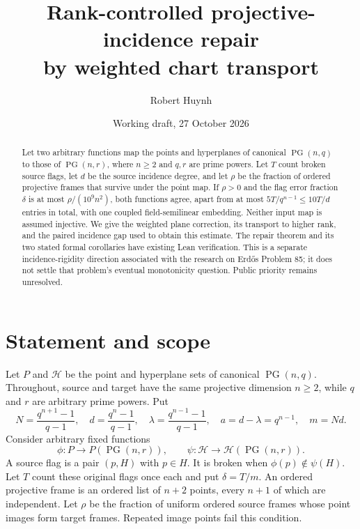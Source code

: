 \documentclass[11pt]{article}
\title{Rank-controlled projective-incidence repair\\by weighted chart transport}
\author{Robert Huynh}
\date{Working draft, 27 October 2026}
\newcommand{\PG}{\operatorname{PG}}
\begin{document}
\maketitle
\begin{abstract}
Let two arbitrary functions map the points and hyperplanes of canonical
$\PG(n,q)$ to those of $\PG(n,r)$, where $n\geq2$ and $q,r$ are prime
powers. Let $T$ count broken source flags, let $d$ be the source incidence
degree, and let $\rho$ be the fraction of ordered projective frames that
survive under the point map. If $\rho>0$ and the flag error fraction
$\delta$ is at most $\rho/(10^9n^2)$, both functions agree, apart from at
most $5T/q^{n-1}\leq10T/d$ entries in total, with one coupled field-semilinear
embedding. Neither input map is assumed injective. We give the weighted
plane correction, its transport to higher rank, and the paired incidence
gap used to obtain this estimate. The repair theorem and its two stated
formal corollaries have existing Lean verification. This is a separate
incidence-rigidity direction associated with the research on Erd\H{o}s
Problem 85; it does not settle that problem's eventual monotonicity question.
Public priority remains unresolved.
\end{abstract}
\tableofcontents

\section{Statement and scope}
Let $P$ and $\mathcal H$ be the point and hyperplane sets of canonical
$\PG(n,q)$. Throughout, source and target have the same projective dimension
$n\geq2$, while $q$ and $r$ are arbitrary prime powers. Put
\begin{equation}\label{counts}
 N=\frac{q^{n+1}-1}{q-1},\quad d=\frac{q^n-1}{q-1},\quad
 \lambda=\frac{q^{n-1}-1}{q-1},\quad a=d-\lambda=q^{n-1},\quad m=Nd.
\end{equation}
Consider arbitrary fixed functions
\[
 \phi:P\longrightarrow P(\PG(n,r)),\qquad
 \psi:\mathcal H\longrightarrow\mathcal H(\PG(n,r)).
\]
A source flag is a pair $(p,H)$ with $p\in H$. It is broken when
$\phi(p)\notin\psi(H)$. Let $T$ count these original flags once each and
put $\delta=T/m$. An ordered projective frame is an ordered list of $n+2$
points, every $n+1$ of which are independent. Let $\rho$ be the fraction
of uniform ordered source frames whose point images form target frames.
Repeated image points fail this condition.
\end{document}
